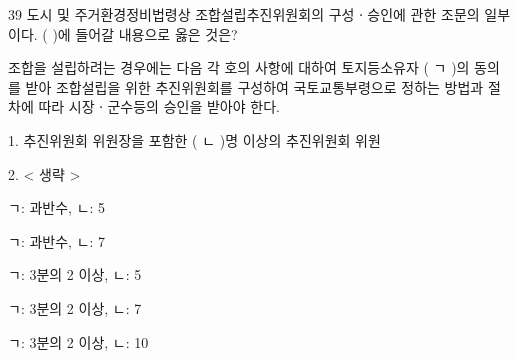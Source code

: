 \begin{question}{39}
도시 및 주거환경정비법령상 조합설립추진위원회의 구성ㆍ승인에 관한 조문의 일부이다. ( )에 들어갈 내용으로 옳은 것은?
\begin{framedtext}
조합을 설립하려는 경우에는 다음 각 호의 사항에 대하여 토지등소유자 ( ㄱ )의 동의를 받아 조합설립을 위한 추진위원회를 구성하여 국토교통부령으로 정하는 방법과 절차에 따라 시장ㆍ군수등의 승인을 받아야 한다. \par
\hspace*{1em}1. 추진위원회 위원장을 포함한 ( ㄴ )명 이상의 추진위원회 위원 \par
\hspace*{1em}2. < 생략 > \par
\end{framedtext}
\begin{choices}
  \item ㄱ: 과반수, ㄴ: 5
  \item ㄱ: 과반수, ㄴ: 7
  \item ㄱ: 3분의 2 이상, ㄴ: 5
  \item ㄱ: 3분의 2 이상, ㄴ: 7
  \item ㄱ: 3분의 2 이상, ㄴ: 10
\end{choices}
\end{question}
